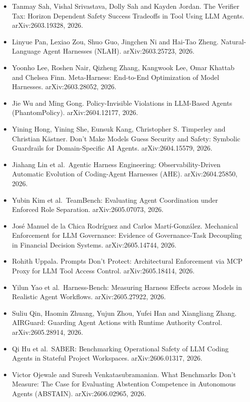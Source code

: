 \documentclass{article}
\begin{document}
\begin{itemize}
\item
  Tanmay Sah, Vishal Srivastava, Dolly Sah and Kayden Jordan. The Verifier Tax: Horizon Dependent Safety Success Tradeoffs in Tool Using LLM Agents. arXiv:2603.19328, 2026.
\item
  Linyue Pan, Lexiao Zou, Shuo Guo, Jingchen Ni and Hai-Tao Zheng. Natural-Language Agent Harnesses (NLAH). arXiv:2603.25723, 2026.
\item
  Yoonho Lee, Roshen Nair, Qizheng Zhang, Kangwook Lee, Omar Khattab and Chelsea Finn. Meta-Harness: End-to-End Optimization of Model Harnesses. arXiv:2603.28052, 2026.
\item
  Jie Wu and Ming Gong. Policy-Invisible Violations in LLM-Based Agents (PhantomPolicy). arXiv:2604.12177, 2026.
\item
  Yining Hong, Yining She, Eunsuk Kang, Christopher S. Timperley and Christian K\"astner. Don't Make Models Guess Security and Safety: Symbolic Guardrails for Domain-Specific AI Agents. arXiv:2604.15579, 2026.
\item
  Jiahang Lin et al.~Agentic Harness Engineering: Observability-Driven Automatic Evolution of Coding-Agent Harnesses (AHE). arXiv:2604.25850, 2026.
\item
  Yubin Kim et al.~TeamBench: Evaluating Agent Coordination under Enforced Role Separation. arXiv:2605.07073, 2026.
\item
  Jos\'e Manuel de la Chica Rodr\'iguez and Carlos Mart\'i-Gonz\'alez. Mechanical Enforcement for LLM Governance: Evidence of Governance-Task Decoupling in Financial Decision Systems. arXiv:2605.14744, 2026.
\item
  Rohith Uppala. Prompts Don't Protect: Architectural Enforcement via MCP Proxy for LLM Tool Access Control. arXiv:2605.18414, 2026.
\item
  Yilun Yao et al.~Harness-Bench: Measuring Harness Effects across Models in Realistic Agent Workflows. arXiv:2605.27922, 2026.
\item
  Suliu Qin, Haomin Zhuang, Yujun Zhou, Yufei Han and Xiangliang Zhang. AIRGuard: Guarding Agent Actions with Runtime Authority Control. arXiv:2605.28914, 2026.
\item
  Qi Hu et al.~SABER: Benchmarking Operational Safety of LLM Coding Agents in Stateful Project Workspaces. arXiv:2606.01317, 2026.
\item
  Victor Ojewale and Suresh Venkatasubramanian. What Benchmarks Don't Measure: The Case for Evaluating Abstention Competence in Autonomous Agents (ABSTAIN). arXiv:2606.02965, 2026.

\end{itemize}
\end{document}

